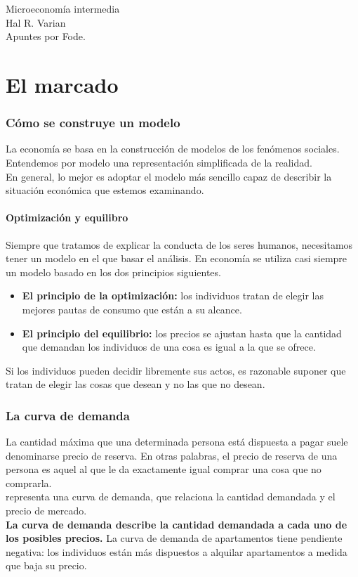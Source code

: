 \documentclass[10pt]{article}
\begin{document}
\begin{center}
\huge Microeconomía intermedia\\
\vspace*{0.5cm}
\large Hal R. Varian\\
\vspace{1cm}
\Large Apuntes por Fode.
\vspace{1.5cm}
\end{center}
\part*{\center El marcado}
\section*{Cómo se construye un modelo}
La economía se basa en la construcción de modelos de los fenómenos sociales. Entendemos por modelo una representación simplificada de la realidad.\\
En general, lo mejor es adoptar el modelo más sencillo capaz de describir la situación económica que estemos examinando. 
\subsection*{Optimización y equilibro}
Siempre que tratamos de explicar la conducta de los seres humanos, necesitamos tener un modelo en el que basar el análisis. En economía se utiliza casi siempre un modelo basado en los dos principios siguientes.
\begin{itemize}
\item \textbf{El principio de la optimización:} los individuos tratan de elegir las mejores pautas de consumo que están a su alcance.
\item \textbf{El principio del equilibrio:} los precios se ajustan hasta que la cantidad que demandan los individuos de una cosa es igual a la que se ofrece.
\end{itemize}
 Si los individuos pueden decidir libremente sus actos, es razonable suponer que tratan de elegir las cosas que desean y no las que no desean. 
\section*{La curva de demanda}
La cantidad máxima que una determinada persona está dispuesta a pagar suele denominarse precio de reserva. En otras palabras, el precio de reserva de una persona es aquel al que le da exactamente igual comprar una cosa que no comprarla.\\
representa una curva de demanda, que relaciona la cantidad demandada y el precio de mercado.\\
\textbf{ La curva de demanda describe la cantidad demandada a
cada uno de los posibles precios.} La curva de demanda de apartamentos tiene pendiente negativa: los individuos están más dispuestos a alquilar apartamentos a medida que baja su precio.
\end{document}
